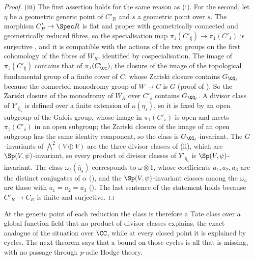\begin{proof}
(iii) The first assertion holds for the same reason as (i). For the second,
let $\bar\eta$ be a geometric generic point of $C'_{R}$ and $\bar{s}$ a
geometric point over $s$. The morphism $C'_{R}\to\Spec R$ is flat and proper
with geometrically connected and geometrically reduced fibres, so the
specialisation map $\pi_{1}(C'_{\bar\eta})\to\pi_{1}(C'_{\bar{s}})$ is
surjective \cite[Tag~0C0P]{Stacks}, and it is compatible with the actions of
the two groups on the first cohomology of the fibres of $W_{R}$, identified by
cospecialisation. The image of $\pi_{1}(C'_{\bar\eta})$ contains that of
$\pi_{1}(C'_{\CC})$, the closure of the image of the topological fundamental
group of a finite cover of $C$, whose Zariski closure contains
$G_{\QQ_{\ell}}$ because the connected monodromy group of $W\to C$ is $G$
(proof of ). So the Zariski closure of the
monodromy of $W_{R}$ over $C'_{\bar{s}}$ contains $G_{\QQ_{\ell}}$. A divisor
class of $Y'_{\bar\eta_{s}}$ is defined over a finite extension of
$\kappa(\eta_{s})$, so it is fixed by an open subgroup of the Galois group,
whose image in $\pi_{1}(C'_{s})$ is open \cite[Tag~0BQI]{Stacks} and meets
$\pi_{1}(C'_{\bar{s}})$ in an open subgroup; the Zariski closure of the image
of an open subgroup has the same identity component, so the class is
$G_{\QQ_{\ell}}$-invariant. The $G$-invariants of ${\textstyle\bigwedge^{2}}(V\oplus V)$ are the
three divisor classes of (ii), which are
$\Sp(V,\psi)$-invariant, so every product of divisor classes of
$Y'_{\bar\eta_{s}}$ is $\Sp(V,\psi)$-invariant. The class
$\omega_{\ell}(\bar\eta_{s})$ corresponds to $\omega\otimes1$, whose
coefficients $a_{1},a_{2},a_{3}$ are the distinct conjugates of $\alpha$
(), and the $\Sp(V,\psi)$-invariant classes among the
$\omega_{a}$ are those with $a_{1}=a_{2}=a_{3}$ ().
The last sentence of the statement holds because $C'_{R}\to C_{R}$ is finite
and surjective.
\end{proof}

At the generic point of each reduction the class is therefore a Tate class
over a global function field that no product of divisor classes explains, the
exact analogue of the situation over $\CC$, while at every closed point it is
explained by cycles. The next theorem says that a bound on those cycles is
all that is missing, with no passage through $p$-adic Hodge theory.


